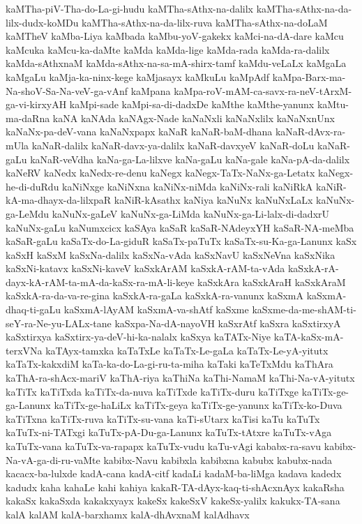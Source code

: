 {kaMTha-piV-Tha-do-La-gi-hudu
kaMTha-sAthx-na-dalilx
kaMTha-sAthx-na-da-lilx-dudx-koMDu
kaMTha-sAthx-na-da-lilx-ruva
kaMTha-sAthx-na-doLaM
kaMTheV
kaMba-Liya
kaMbada
kaMbu-yoV-gakekx
kaMci-na-dA-dare
kaMcu
kaMcuka
kaMcu-ka-daMte
kaMda
kaMda-lige
kaMda-rada
kaMda-ra-dalilx
kaMda-sAthxnaM
kaMda-sAthx-na-sa-mA-shirx-tamf
kaMdu-veLaLx
kaMgaLa
kaMgaLu
kaMja-ka-ninx-kege
kaMjasayx
kaMkuLu
kaMpAdf
kaMpa-Barx-ma-Na-shoV-Sa-Na-veV-ga-vAnf
kaMpana
kaMpa-roV-mAM-ca-savx-ra-neV-tArxM-ga-vi-kirxyAH
kaMpi-sade
kaMpi-sa-di-dadxDe
kaMthe
kaMthe-yanunx
kaMtu-ma-daRna
kaNA
kaNAda
kaNAgx-Nade
kaNaNxli
kaNaNxlilx
kaNaNxnUnx
kaNaNx-pa-deV-vana
kaNaNxpapx
kaNaR
kaNaR-baM-dhana
kaNaR-dAvx-ra-mUla
kaNaR-dalilx
kaNaR-davx-ya-dalilx
kaNaR-davxyeV
kaNaR-doLu
kaNaR-gaLu
kaNaR-veVdha
kaNa-ga-La-lilxve
kaNa-gaLu
kaNa-gale
kaNa-pA-da-dalilx
kaNeRV
kaNedx
kaNedx-re-denu
kaNegx
kaNegx-TaTx-NaNx-ga-Letatx
kaNegx-he-di-duRdu
kaNiNxge
kaNiNxna
kaNiNx-niMda
kaNiNx-rali
kaNiRkA
kaNiR-kA-ma-dhayx-da-lilxpaR
kaNiR-kAsathx
kaNiya
kaNuNx
kaNuNxLaLx
kaNuNx-ga-LeMdu
kaNuNx-gaLeV
kaNuNx-ga-LiMda
kaNuNx-ga-Li-lalx-di-dadxrU
kaNuNx-gaLu
kaNumxcicx
kaSAya
kaSaR
kaSaR-NAdeyxYH
kaSaR-NA-meMba
kaSaR-gaLu
kaSaTx-do-La-giduR
kaSaTx-paTuTx
kaSaTx-su-Ka-ga-Lanunx
kaSx
kaSxH
kaSxM
kaSxNa-dalilx
kaSxNa-vAda
kaSxNavU
kaSxNeVna
kaSxNika
kaSxNi-katavx
kaSxNi-kaveV
kaSxkArAM
kaSxkA-rAM-ta-vAda
kaSxkA-rA-dayx-kA-rAM-ta-mA-da-kaSx-ra-mA-li-keye
kaSxkAra
kaSxkAraH
kaSxkAraM
kaSxkA-ra-da-va-re-gina
kaSxkA-ra-gaLa
kaSxkA-ra-vanunx
kaSxmA
kaSxmA-dhaq-ti-gaLu
kaSxmA-lAyAM
kaSxmA-va-shAtf
kaSxme
kaSxme-da-me-shAM-ti-seY-ra-Ne-yu-LALx-tane
kaSxpa-Na-dA-nayoVH
kaSxrAtf
kaSxra
kaSxtirxyA
kaSxtirxya
kaSxtirx-ya-deV-hi-ka-nalalx
kaSxya
kaTATx-Niye
kaTA-kaSx-mA-terxVNa
kaTAyx-tamxka
kaTaTxLe
kaTaTx-Le-gaLa
kaTaTx-Le-yA-yitutx
kaTaTx-kakxdiM
kaTa-ka-do-La-gi-ru-ta-miha
kaTaki
kaTeTxMdu
kaThAra
kaThA-ra-shAcx-mariV
kaThA-riya
kaThiNa
kaThi-NamaM
kaThi-Na-vA-yitutx
kaTiTx
kaTiTxda
kaTiTx-da-nuva
kaTiTxde
kaTiTx-duru
kaTiTxge
kaTiTx-ge-ga-Lanunx
kaTiTx-ge-haLiLx
kaTiTx-geya
kaTiTx-ge-yanunx
kaTiTx-ko-Duva
kaTiTxna
kaTiTx-ruva
kaTiTx-su-vana
kaTi-sUtarx
kaTisi
kaTu
kaTuTx
kaTuTx-ni-TATxgi
kaTuTx-pA-Du-ga-Lanunx
kaTuTx-tAtxre
kaTuTx-vAga
kaTuTx-vana
kaTuTx-va-rapapx
kaTuTx-vudu
kaTu-vAgi
kababx-ra-savu
kabibx-Na-vA-ga-di-ru-vaMte
kabibx-Navu
kabibxla
kabibxna
kabubx
kabubx-nada
kacacx-ba-lulxde
kadA-cana
kadA-citf
kadaLi
kadaM-ba-liMga
kadava
kadedx
kadudx
kaha
kahaLe
kahi
kahiya
kakaR-TA-dAyx-kaq-ti-shAcxnAyx
kakaRsha
kakaSx
kakaSxda
kakakxyayx
kakeSx
kakeSxV
kakeSx-yalilx
kakukx-TA-sana
kalA
kalAM
kalA-barxhamx
kalA-dhAvxnaM
kalAdhavx
}

